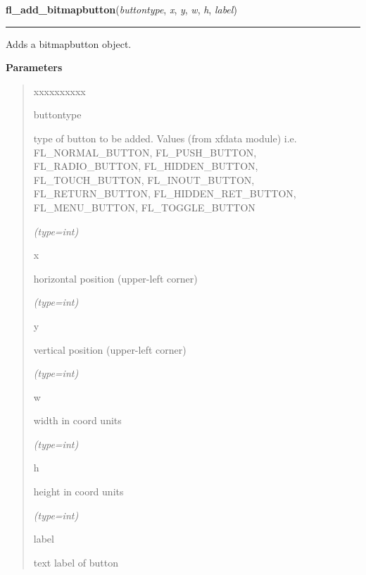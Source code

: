 \hspace{.8\funcindent}\begin{boxedminipage}{\funcwidth}

    \raggedright \textbf{fl\_add\_bitmapbutton}(\textit{buttontype}, \textit{x}, \textit{y}, \textit{w}, \textit{h}, \textit{label})

    \vspace{-1.5ex}

    \rule{\textwidth}{0.5\fboxrule}
\setlength{\parskip}{2ex}
    Adds a bitmapbutton object.

\setlength{\parskip}{1ex}
      \textbf{Parameters}
      \vspace{-1ex}

      \begin{quote}
        \begin{Ventry}{xxxxxxxxxx}

          \item[buttontype]

          type of button to be added. Values (from xfdata module) i.e. 
          FL\_NORMAL\_BUTTON, FL\_PUSH\_BUTTON, FL\_RADIO\_BUTTON, 
          FL\_HIDDEN\_BUTTON, FL\_TOUCH\_BUTTON, FL\_INOUT\_BUTTON, 
          FL\_RETURN\_BUTTON, FL\_HIDDEN\_RET\_BUTTON, FL\_MENU\_BUTTON, 
          FL\_TOGGLE\_BUTTON

            {\it (type=int)}

          \item[x]

          horizontal position (upper-left corner)

            {\it (type=int)}

          \item[y]

          vertical position (upper-left corner)

            {\it (type=int)}

          \item[w]

          width in coord units

            {\it (type=int)}

          \item[h]

          height in coord units

            {\it (type=int)}

          \item[label]

          text label of button


\end{Ventry}
\end{quote}
\end{boxedminipage}
